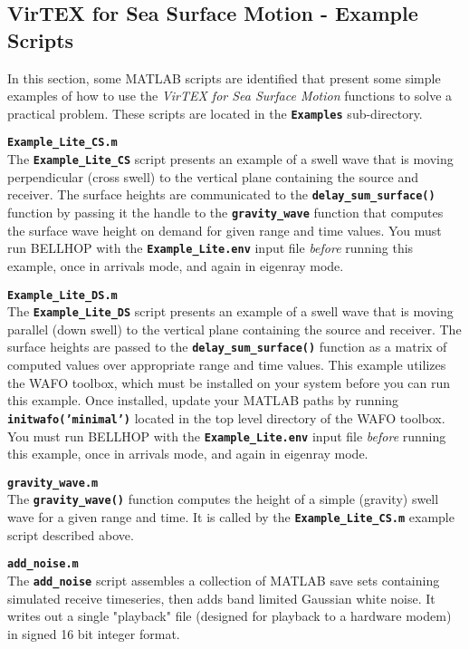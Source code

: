 \documentclass[12pt, letterpaper, oneside]{article}
\begin{document}
\subsection{VirTEX for Sea Surface Motion - Example Scripts}
In this section, some MATLAB scripts are identified that present some
simple examples of how to use the {\em VirTEX for Sea Surface Motion}
functions to solve a practical problem. These scripts are located in
the {\tt \bf Examples} sub-directory.

\begin{description}

\item {\tt \bf Example\_Lite\_CS.m}\hfill \\
The {\tt \bf Example\_Lite\_CS} script presents an example of a swell
wave that is moving perpendicular (cross swell) to the vertical plane
containing the source and receiver. The surface heights are communicated
to the {\tt \bf delay\_sum\_surface()} function by passing it the handle
to the {\tt \bf gravity\_wave} function that computes the surface wave
height on demand for given range and time values. You must run BELLHOP
with the {\tt \bf Example\_Lite.env} input file {\em before} running
this example, once in arrivals mode, and again in eigenray mode.

\item {\tt \bf Example\_Lite\_DS.m}\hfill \\
The {\tt \bf Example\_Lite\_DS} script presents an example of a
swell wave that is moving parallel (down swell) to the vertical plane
containing the source and receiver. The surface heights are passed
to the {\tt \bf delay\_sum\_surface()} function as a matrix of computed
values over appropriate range and time values. This example utilizes
the WAFO toolbox, which must be installed on your system before you can
run this example.  Once installed, update your MATLAB paths by running
{\tt \bf initwafo('minimal')} located in the top level directory of the
WAFO toolbox. You must run BELLHOP with the {\tt \bf Example\_Lite.env}
input file {\em before} running this example, once in arrivals mode,
and again in eigenray mode.

\item {\tt \bf gravity\_wave.m}\hfill \\
The {\tt \bf gravity\_wave()} function computes the height of a simple
(gravity) swell wave for a given range and time. It is called by the
{\tt \bf Example\_Lite\_CS.m} example script described above.

\item {\tt \bf add\_noise.m}\hfill \\
The {\tt \bf add\_noise} script assembles a collection of MATLAB save
sets containing simulated receive timeseries, then adds band limited
Gaussian white noise. It writes out a single "playback" file (designed
for playback to a hardware modem) in signed 16 bit integer format.

\end{description}
\end{document}
